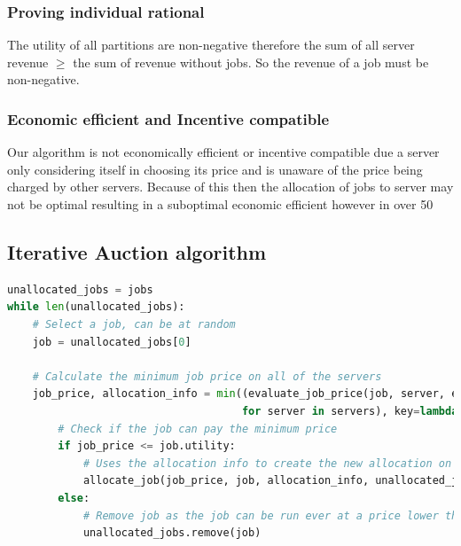 \subsubsection{Proving individual rational}
The utility of all partitions are non-negative therefore the sum of all server revenue $\geq$ the sum of revenue without
jobs. So the revenue of a job must be non-negative. %
\subsubsection{Economic efficient and Incentive compatible}
Our algorithm is not economically efficient or incentive compatible due a server only considering itself in choosing its
price and is unaware of the price being charged by other servers. Because of this then the allocation of jobs to server
may not be optimal resulting in a suboptimal economic efficient however in over 50%

\subsection{Iterative Auction algorithm}\label{subsec:iterative-auction-algorithm}
\begin{lstlisting}[language=Python]
unallocated_jobs = jobs
while len(unallocated_jobs):
    # Select a job, can be at random
    job = unallocated_jobs[0]

    # Calculate the minimum job price on all of the servers
    job_price, allocation_info = min((evaluate_job_price(job, server, epsilon=epsilon)
                                     for server in servers), key=lambda bid: bid[0])
        # Check if the job can pay the minimum price
        if job_price <= job.utility:
            # Uses the allocation info to create the new allocation on the selected server
            allocate_job(job_price, job, allocation_info, unallocated_jobs)
        else:
            # Remove job as the job can be run ever at a price lower than the job's value utility
            unallocated_jobs.remove(job)
\end{lstlisting}

